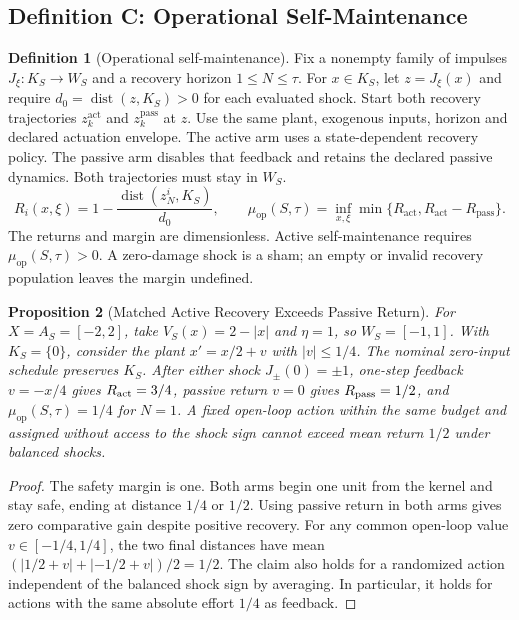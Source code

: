 \documentclass[11pt,a4paper]{article}
\newtheorem{proposition}{Proposition}[section]
\theoremstyle{definition}
\newtheorem{definition}[proposition]{Definition}
\newcommand{\Aset}{A_S}
\newcommand{\Maint}{\mu_{\mathrm{op}}}
\newcommand{\dist}{\operatorname{dist}}
\begin{document}
\subsection{Definition C: Operational Self-Maintenance}
\begin{definition}[Operational self-maintenance]\label{def:operational-self-maintenance}
Fix a nonempty family of impulses $J_\xi:K_S\to W_S$ and a recovery horizon $1\le N\le\tau$. For $x\in K_S$, let $z=J_\xi(x)$ and require $d_0=\dist(z,K_S)>0$ for each evaluated shock. Start both recovery trajectories $z_k^{\mathrm{act}}$ and $z_k^{\mathrm{pass}}$ at $z$. Use the same plant, exogenous inputs, horizon and declared actuation envelope. The active arm uses a state-dependent recovery policy. The passive arm disables that feedback and retains the declared passive dynamics. Both trajectories must stay in $W_S$.
\[
 R_i(x,\xi)=1-\frac{\dist(z_N^i,K_S)}{d_0},\qquad
 \Maint(S,\tau)=\inf_{x,\xi}\min\{R_{\mathrm{act}},R_{\mathrm{act}}-R_{\mathrm{pass}}\}.
\]
The returns and margin are dimensionless. Active self-maintenance requires $\Maint(S,\tau)>0$. A zero-damage shock is a sham; an empty or invalid recovery population leaves the margin undefined.
\end{definition}

\begin{proposition}[Matched Active Recovery Exceeds Passive Return]\label{prop:matched-active-recovery}
For $X=\Aset=[-2,2]$, take $V_S(x)=2-|x|$ and $\eta=1$, so $W_S=[-1,1]$. With $K_S=\{0\}$, consider the plant $x'=x/2+v$ with $|v|\le1/4$. The nominal zero-input schedule preserves $K_S$. After either shock $J_\pm(0)=\pm1$, one-step feedback $v=-x/4$ gives $R_{\rm act}=3/4$, passive return $v=0$ gives $R_{\rm pass}=1/2$, and $\Maint(S,\tau)=1/4$ for $N=1$. A fixed open-loop action within the same budget and assigned without access to the shock sign cannot exceed mean return $1/2$ under balanced shocks.
\end{proposition}
\begin{proof}
The safety margin is one. Both arms begin one unit from the kernel and stay safe, ending at distance $1/4$ or $1/2$. Using passive return in both arms gives zero comparative gain despite positive recovery. For any common open-loop value $v\in[-1/4,1/4]$, the two final distances have mean $(|1/2+v|+|-1/2+v|)/2=1/2$. The claim also holds for a randomized action independent of the balanced shock sign by averaging. In particular, it holds for actions with the same absolute effort $1/4$ as feedback.
\end{proof}
\end{document}
